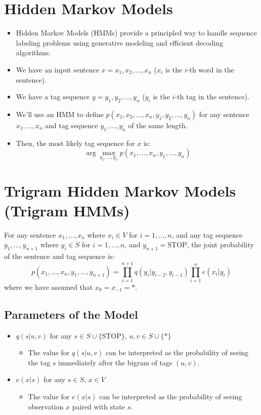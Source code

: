 \section{Hidden Markov Models}
  \begin{itemize}
    \item  Hidden Markov Models (HMMs) provide a principled way to handle sequence labeling problems using generative modeling and efficient decoding algorithms.
    \item We have an input sentence $x = x_1, x_2, \ldots, x_n$ ($x_i$ is the $i$-th word in the sentence).
    \item We have a tag sequence $y = y_1, y_2, \ldots, y_n$ ($y_i$ is the $i$-th tag in the sentence).
    \item We'll use an HMM to define $p(x_1, x_2, \ldots, x_n, y_1, y_2, \ldots, y_n)$ for any sentence $x_1, \ldots, x_n$ and tag sequence $y_1, \ldots, y_n$ of the same length. \cite{kupiec1992robust}
    \item Then, the most likely tag sequence for $x$ is:
    \[
      \arg\max_{y_1,\ldots,y_n} p(x_1, \ldots, x_n, y_1, \ldots, y_n)
    \]
  \end{itemize}

\section{Trigram Hidden Markov Models (Trigram HMMs)}
  For any sentence $x_1, \ldots, x_n$ where $x_i \in V$ for $i = 1, \ldots, n$, and any tag sequence $y_1, \ldots, y_{n+1}$ where $y_i \in S$ for $i = 1, \ldots, n$, and $y_{n+1} = \text{STOP}$, the joint probability of the sentence and tag sequence is:
  \[
    p(x_1, \ldots, x_n, y_1, \ldots, y_{n+1}) = \prod_{i=1}^{n+1} q(y_i | y_{i-2}, y_{i-1}) \prod_{i=1}^{n} e(x_i | y_i)
  \]
  where we have assumed that $x_0 = x_{-1} = *$.

\subsection{Parameters of the Model}
  \begin{itemize}
    \item $q(s|u, v)$ for any $s \in S \cup \{\text{STOP}\}$, $u, v \in S \cup \{*\}$
    \begin{itemize}
     \item The value for $q(s|u,v)$ can be interpreted as the probability of seeing the tag $s$ immediately after the bigram of tags $(u, v)$.
    \end{itemize}    
    \item $e(x|s)$ for any $s \in S$, $x \in V$ 
    \begin{itemize}
     \item The value for $e(x|s)$ can be interpreted as the probability of seeing observation $x$ paired with state $s$.
    \end{itemize}

    
    
  \end{itemize}

